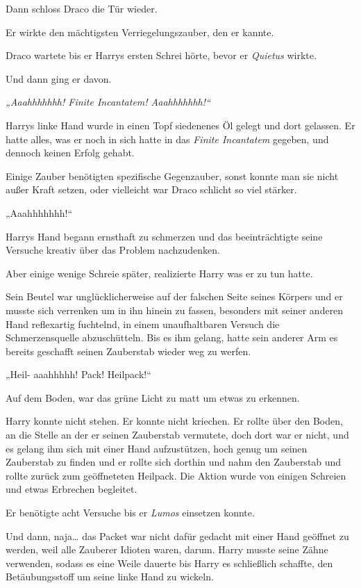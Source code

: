 {Dann schloss Draco die Tür wieder.

Er wirkte den mächtigsten Verriegelungszauber, den er kannte.

Draco wartete bis er Harrys ersten Schrei hörte, bevor er \emph{Quietus} wirkte\emph{.}

Und dann ging er davon.

\emph{„Aaahhhhhhh! Finite Incantatem! Aaahhhhhhh!“}

Harrys linke Hand wurde in einen Topf siedenenes Öl gelegt und dort gelassen. Er hatte alles, was er noch in sich hatte in das \emph{Finite Incantatem} gegeben, und dennoch keinen Erfolg gehabt.

Einige Zauber benötigten spezifische Gegenzauber, sonst konnte man sie nicht außer Kraft setzen, oder vielleicht war Draco schlicht so viel stärker.

„Aaahhhhhhh!“

Harrys Hand begann ernsthaft zu schmerzen und das beeinträchtigte seine Versuche kreativ über das Problem nachzudenken.

Aber einige wenige Schreie später, realizierte Harry was er zu tun hatte.

Sein Beutel war unglücklicherweise auf der falschen Seite seines Körpers und er musste sich verrenken um in ihn hinein zu fassen, besonders mit seiner anderen Hand reflexartig fuchtelnd, in einem unaufhaltbaren Versuch die Schmerzensquelle abzuschütteln. Bis es ihm gelang, hatte sein anderer Arm es bereits geschafft seinen Zauberstab wieder weg zu werfen.

„Heil- aaahhhhh! Pack! Heilpack!“

Auf dem Boden, war das grüne Licht zu matt um etwas zu erkennen.

Harry konnte nicht stehen. Er konnte nicht kriechen. Er rollte über den Boden, an die Stelle an der er seinen Zauberstab vermutete, doch dort war er nicht, und es gelang ihm sich mit einer Hand aufzustützen, hoch genug um seinen Zauberstab zu finden und er rollte sich dorthin und nahm den Zauberstab und rollte zurück zum geöffneteten Heilpack. Die Aktion wurde von einigen Schreien und etwas Erbrechen begleitet.

Er benötigte acht Versuche bis er \emph{Lumos} einsetzen konnte.

Und dann, naja… das Packet war nicht dafür gedacht mit einer Hand geöffnet zu werden, weil alle Zauberer Idioten waren, darum. Harry musste seine Zähne verwenden, sodass es eine Weile dauerte bis Harry es schließlich schaffte, den Betäubungsstoff um seine linke Hand zu wickeln.

}
